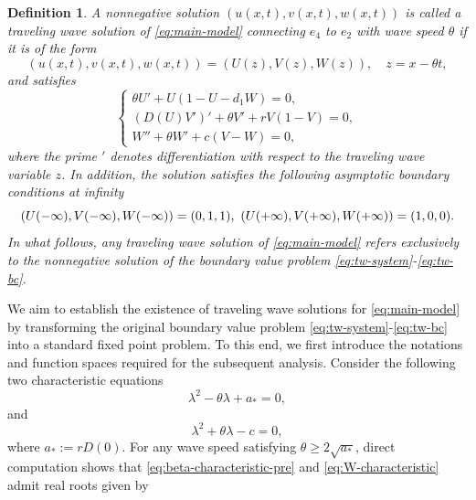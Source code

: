 \documentclass[preprint,sort&compress,final,12pt]{elsarticle}
\newtheorem{definition}[theorem]{Definition}
\numberwithin{equation}{section}
\begin{document}
\begin{definition}
A nonnegative solution $(u(x,t),v(x,t),w(x,t))$ is called a traveling wave solution of \eqref{eq:main-model} connecting $e_4$ to $e_2$ with wave speed $\theta$ if it is of the form
\begin{equation*}
(u(x,t),v(x,t),w(x,t))=(U(z),V(z),W(z)),\quad z=x-\theta t,
\end{equation*}
and satisfies
\begin{equation}\label{eq:tw-system}
\begin{cases}
\theta U'+U(1-U-d_1W)=0,\\[0.2cm]
(D(U) V')' +\theta V'+rV(1-V)=0,\\[0.2cm]
W''+\theta W'+c(V-W)=0,
\end{cases}
\end{equation}
where the prime $'$ denotes differentiation with respect to the traveling wave variable $z$. In addition, the solution satisfies the following asymptotic boundary conditions at infinity
\begin{equation}\label{eq:tw-bc}
(U(-\infty), V(-\infty), W(-\infty))=(0, 1, 1),\
(U(+\infty), V(+\infty), W(+\infty))=(1, 0, 0).\\[0.2cm]
\end{equation}
In what follows, any traveling wave solution of \eqref{eq:main-model} refers exclusively to the nonnegative solution of the boundary value problem \eqref{eq:tw-system}-\eqref{eq:tw-bc}.
\end{definition}

We aim to establish the existence of traveling wave solutions for \eqref{eq:main-model} by transforming the original boundary value problem \eqref{eq:tw-system}-\eqref{eq:tw-bc}  into a standard fixed point problem. To this end, we first introduce the notations and function spaces required for the subsequent analysis. Consider the following two characteristic equations
\begin{equation}\label{eq:beta-characteristic-pre}
\lambda^2-\theta\lambda+a_*=0,
\end{equation}
and
\begin{equation}\label{eq:W-characteristic}
\lambda^2+\theta\lambda-c=0,
\end{equation}
where $a_*:=rD(0)$. For any wave speed satisfying $\theta\ge 2\sqrt{a_*}$, direct computation shows that \eqref{eq:beta-characteristic-pre} and \eqref{eq:W-characteristic} admit real roots given by
\end{document}
